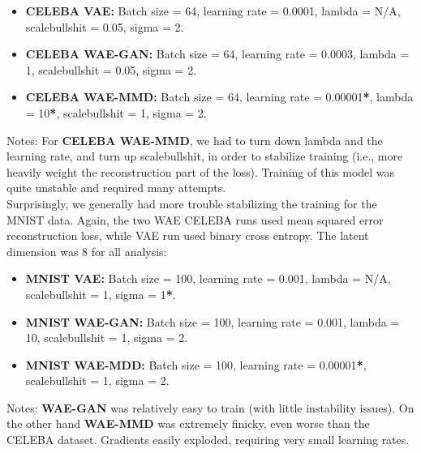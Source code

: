 \documentclass[12pt,english]{amsart}
\theoremstyle{definition}
\begin{document}
\begin{itemize}

    \item{\textbf{CELEBA VAE:} Batch size = 64, learning rate = 0.0001,
          lambda = N/A, scalebullshit = 0.05, sigma = 2.}

    \item{\textbf{CELEBA WAE-GAN:} Batch size = 64, learning rate = 0.0003,
          lambda = 1, scalebullshit = 0.05, sigma = 2.}

    \item{\textbf{CELEBA WAE-MMD:} Batch size = 64,
          learning rate = 0.00001\textbf{*}, lambda = 10\textbf{*},
          scalebullshit = 1, sigma = 2.}

\end{itemize}

Notes: For \textbf{CELEBA WAE-MMD}, we had to turn down lambda and the learning
rate, and turn up scalebullshit, in order to stabilize training (i.e., more
heavily weight the reconstruction part of the loss). Training of this model was
quite unstable and required many attempts. \\

Surprisingly, we generally had more trouble stabilizing the training for the
MNIST data. Again, the two WAE CELEBA runs used mean squared error
reconstruction loss, while VAE run used binary cross entropy. The latent
dimension was 8 for all analysis: \\

\begin{itemize}
    \item{\textbf{MNIST VAE:} Batch size = 100, learning rate = 0.001,
          lambda = N/A, scalebullshit = 1, sigma = 1\textbf{*}.} \\

    \item{\textbf{MNIST WAE-GAN:} Batch size = 100, learning rate = 0.001,
          lambda = 10, scalebullshit = 1, sigma = 2.} \\

    \item{\textbf{MNIST WAE-MDD:} Batch size = 100,
          learning rate = 0.00001\textbf{*}, scalebullshit = 1, sigma = 2.} \\

\end{itemize}

Notes: \textbf{WAE-GAN}  was relatively easy to train (with little instability
issues). On the other hand \textbf{WAE-MMD} was extremely finicky, even worse
than the CELEBA dataset. Gradients easily exploded, requiring very small
learning rates. \\
\end{document}
